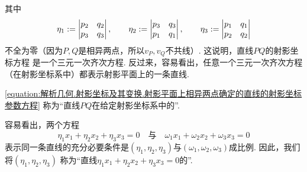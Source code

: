 其中\begin{equation*}
	\eta_1 := \begin{vmatrix}
		p_2 & q_2 \\
		p_3 & q_3
	\end{vmatrix},
	\qquad
	\eta_2 := \begin{vmatrix}
		p_3 & q_3 \\
		p_1 & q_1
	\end{vmatrix},
	\qquad
	\eta_3 := \begin{vmatrix}
		p_1 & q_1 \\
		p_2 & q_2
	\end{vmatrix}
\end{equation*}
不全为零（因为\(P,Q\)是相异两点，所以\(v_P,v_Q\)不共线）.
这说明，直线\(PQ\)的射影坐标方程
是一个三元一次齐次方程.
反过来，容易看出，任意一个三元一次齐次方程（在射影坐标系中）都表示射影平面上的一条直线.

\cref{equation:解析几何.射影坐标及其变换.射影平面上相异两点确定的直线的射影坐标参数方程}
称为“直线\(PQ\)在给定射影坐标系中的”.

容易看出，两个方程\begin{equation*}
	\eta_1 x_1 + \eta_2 x_2 + \eta_3 x_3 = 0
	\quad\text{与}\quad
	\omega_1 x_1 + \omega_2 x_2 + \omega_3 x_3 = 0
\end{equation*}
表示同一条直线的充分必要条件是\((\eta_1,\eta_2,\eta_3)\)与\((\omega_1,\omega_2,\omega_3)\)成比例.
因此，我们将\((\eta_1,\eta_2,\eta_3)\)
称为“直线\(\eta_1 x_1 + \eta_2 x_2 + \eta_3 x_3 = 0\)的”.

